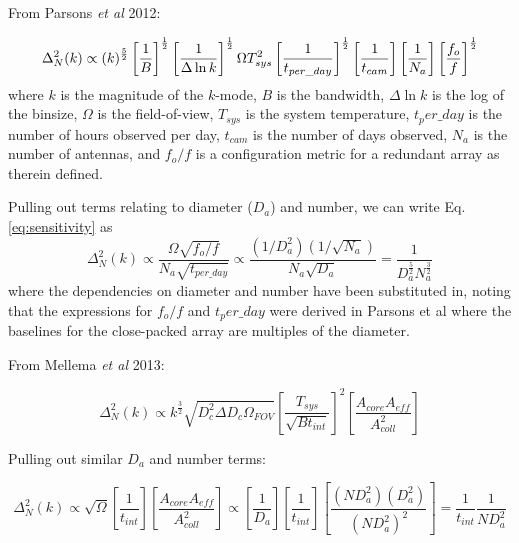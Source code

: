 \documentclass[11pt]{article}
\begin{document}
From Parsons {\em et al} 2012:

\small
\begin{equation}
\label{eq:sensitivity}
\Delta^2_N(k) \propto (k)^\frac{5}{2}
                                         \left[\frac{1}{B}\right]^\frac{1}{2}
                                         \left[\frac{1}{\Delta\ln k}\right]^\frac{1}{2} \\
                           \Omega T_{sys}^2
                                         \left[\frac{1}{t_{per\_day}}\right]^\frac{1}{2}
                           \left[\frac{1}{t_{cam}}\right]
                                         \left[\frac{1}{N_a}\right]
                                         \left[\frac{f_o}{f}\right]^\frac{1}{2}
\end{equation}
where $k$ is the magnitude of the $k$-mode, $B$ is the bandwidth, $\Delta\ln k$ is the log
of the binsize, $\Omega$ is the field-of-view, $T_{sys}$ is the system temperature, 
${t_per\_day}$ is the number of hours observed per day, $t_{cam}$ is the number of days
observed, $N_a$ is the number of antennas, and $f_o/f$ is a configuration metric for a 
redundant array as therein defined.

Pulling out terms relating to diameter ($D_a$) and number, we can write Eq. \ref{eq:sensitivity} as
\begin{equation}
\label{eq:reducedSensitivity}
\Delta^2_N(k) \propto \frac{\Omega \sqrt{f_o/f}}{N_a\sqrt{t_{per\_day}}} \propto \frac{(1/D_a^2)(1/\sqrt{N_a})}{N_a\sqrt{D_a}}
= \frac{1}{D_a^{\frac{5}{2}}N_a^{\frac{3}{2}}}
\end{equation}
where the dependencies on diameter and number have been substituted in, noting that the expressions for $f_o/f$ and 
$t_per\_day$ were derived in Parsons et al where the baselines for the close-packed array are multiples of the diameter.

From Mellema {\em et al} 2013:

\begin{equation}
\Delta^2_N(k) \propto k^\frac{3}{2}\sqrt{D_c^2\Delta D_c\Omega_{FOV}}\left[\frac{T_{sys}}{\sqrt{Bt_{int}}}\right]^2\left[\frac{A_{core}A_{eff}}{A^2_{coll}}\right]
\end{equation}

Pulling out similar $D_a$ and number terms:

\begin{equation}
\Delta^2_N(k) \propto \sqrt{\Omega} \left[ \frac{1}{t_{int}}  \right] \left[\frac{A_{core}A_{eff}}{A^2_{coll}}\right] \propto
\left[\frac{1}{D_a}\right] \left[ \frac{1}{t_{int}}  \right] \left[\frac{(ND_a^2)(D_a^2)}{(ND_a^2)^2}\right] = \frac{1}{t_{int}}\frac{1}{ND_a^2}
\end{equation}
\end{document}
